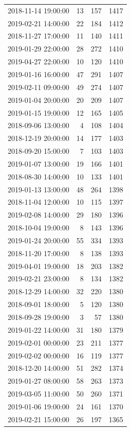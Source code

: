 \begin{tabular}{lrrr}
2018-11-14 19:00:00 & 13 & 157 & 1417 \\
2019-02-21 14:00:00 & 22 & 184 & 1412 \\
2018-11-27 17:00:00 & 11 & 140 & 1411 \\
2019-01-29 22:00:00 & 28 & 272 & 1410 \\
2019-04-27 22:00:00 & 10 & 120 & 1410 \\
2019-01-16 16:00:00 & 47 & 291 & 1407 \\
2019-02-11 09:00:00 & 49 & 274 & 1407 \\
2019-01-04 20:00:00 & 20 & 209 & 1407 \\
2019-01-15 19:00:00 & 12 & 165 & 1405 \\
2018-09-06 13:00:00 & 4 & 108 & 1404 \\
2018-12-19 20:00:00 & 14 & 177 & 1403 \\
2018-09-20 15:00:00 & 7 & 103 & 1403 \\
2019-01-07 13:00:00 & 19 & 166 & 1401 \\
2018-08-30 14:00:00 & 10 & 133 & 1401 \\
2019-01-13 13:00:00 & 48 & 264 & 1398 \\
2018-11-04 12:00:00 & 10 & 115 & 1397 \\
2019-02-08 14:00:00 & 29 & 180 & 1396 \\
2018-10-04 19:00:00 & 8 & 143 & 1396 \\
2019-01-24 20:00:00 & 55 & 334 & 1393 \\
2018-11-20 17:00:00 & 8 & 138 & 1393 \\
2019-04-01 19:00:00 & 18 & 203 & 1382 \\
2019-02-21 23:00:00 & 8 & 134 & 1382 \\
2018-12-29 14:00:00 & 32 & 220 & 1380 \\
2018-09-01 18:00:00 & 5 & 120 & 1380 \\
2018-09-28 19:00:00 & 3 & 57 & 1380 \\
2019-01-22 14:00:00 & 31 & 180 & 1379 \\
2019-02-01 00:00:00 & 23 & 211 & 1377 \\
2019-02-02 00:00:00 & 16 & 119 & 1377 \\
2018-12-20 14:00:00 & 51 & 282 & 1374 \\
2019-01-27 08:00:00 & 58 & 263 & 1373 \\
2019-03-05 11:00:00 & 50 & 260 & 1371 \\
2019-01-06 19:00:00 & 24 & 161 & 1370 \\
2019-02-21 15:00:00 & 26 & 197 & 1365 \\

\end{tabular}
